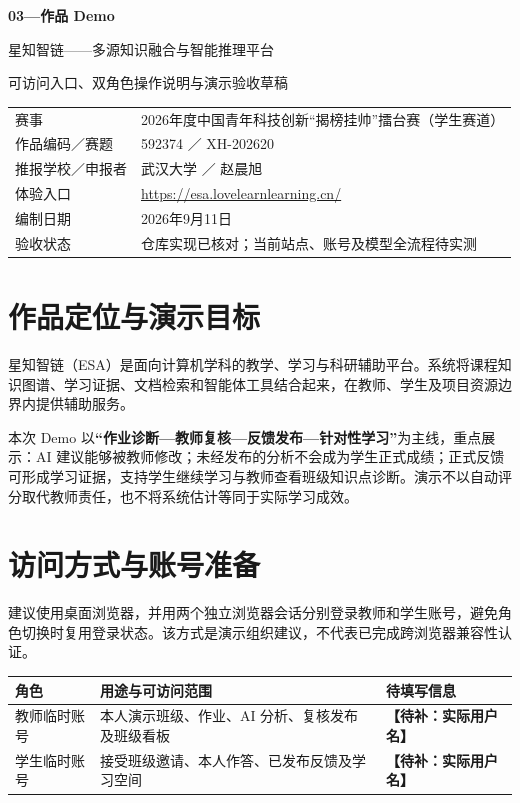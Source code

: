 \documentclass[UTF8,a4paper,zihao=-4,fontset=fandol]{ctexart}
\newcommand{\pending}[1]{\textbf{【待补：#1】}}
\begin{document}
\begin{center}
  {\LARGE\bfseries 03—作品 Demo}\par\vspace{0.7em}
  {\large 星知智链——多源知识融合与智能推理平台}\par
  可访问入口、双角色操作说明与演示验收草稿
\end{center}
\noindent\begin{tabularx}{\textwidth}{@{}lX@{}}
\toprule
赛事 & 2026年度中国青年科技创新“揭榜挂帅”擂台赛（学生赛道） \\
作品编码／赛题 & 592374 ／ XH-202620 \\
推报学校／申报者 & 武汉大学 ／ 赵晨旭 \\
体验入口 & \url{https://esa.lovelearnlearning.cn/} \\
编制日期 & 2026年9月11日 \\
验收状态 & 仓库实现已核对；当前站点、账号及模型全流程待实测 \\
\bottomrule
\end{tabularx}

\section{作品定位与演示目标}
星知智链（ESA）是面向计算机学科的教学、学习与科研辅助平台。系统将课程知识图谱、学习证据、文档检索和智能体工具结合起来，在教师、学生及项目资源边界内提供辅助服务。

本次 Demo 以\textbf{“作业诊断—教师复核—反馈发布—针对性学习”}为主线，重点展示：AI 建议能够被教师修改；未经发布的分析不会成为学生正式成绩；正式反馈可形成学习证据，支持学生继续学习与教师查看班级知识点诊断。演示不以自动评分取代教师责任，也不将系统估计等同于实际学习成效。

\section{访问方式与账号准备}
建议使用桌面浏览器，并用两个独立浏览器会话分别登录教师和学生账号，避免角色切换时复用登录状态。该方式是演示组织建议，不代表已完成跨浏览器兼容性认证。

\noindent\begin{tabularx}{\textwidth}{@{}p{2.2cm}Xp{3.2cm}@{}}
\toprule
角色 & 用途与可访问范围 & 待填写信息 \\
\midrule
教师临时账号 & 本人演示班级、作业、AI 分析、复核发布及班级看板 & \pending{实际用户名} \\
学生临时账号 & 接受班级邀请、本人作答、已发布反馈及学习空间 & \pending{实际用户名} \\
\bottomrule
\end{tabularx}
\end{document}
